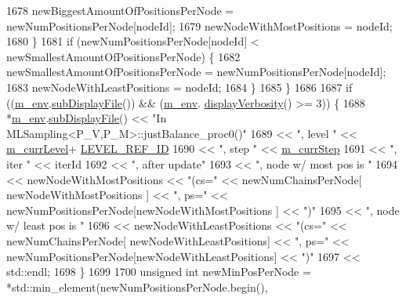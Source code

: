 \begin{DoxyCode}
1678         newBiggestAmountOfPositionsPerNode = newNumPositionsPerNode[nodeId];
1679         newNodeWithMostPositions = nodeId;
1680       \}
1681       \textcolor{keywordflow}{if} (newNumPositionsPerNode[nodeId] < newSmallestAmountOfPositionsPerNode) \{
1682         newSmallestAmountOfPositionsPerNode = newNumPositionsPerNode[nodeId];
1683         newNodeWithLeastPositions = nodeId;
1684       \}
1685     \}
1686 
1687     \textcolor{keywordflow}{if} ((\hyperlink{class_q_u_e_s_o_1_1_m_l_sampling_a13f1ca4fe9f94822fe572a743eaced1d}{m\_env}.\hyperlink{class_q_u_e_s_o_1_1_base_environment_a8a0064746ae8dddfece4229b9ad374d6}{subDisplayFile}()) && (\hyperlink{class_q_u_e_s_o_1_1_m_l_sampling_a13f1ca4fe9f94822fe572a743eaced1d}{m\_env}.
      \hyperlink{class_q_u_e_s_o_1_1_base_environment_a1fe5f244fc0316a0ab3e37463f108b96}{displayVerbosity}() >= 3)) \{
1688       *\hyperlink{class_q_u_e_s_o_1_1_m_l_sampling_a13f1ca4fe9f94822fe572a743eaced1d}{m\_env}.\hyperlink{class_q_u_e_s_o_1_1_base_environment_a8a0064746ae8dddfece4229b9ad374d6}{subDisplayFile}() << \textcolor{stringliteral}{"In MLSampling<P\_V,P\_M>::justBalance\_proc0()"}
1689                               << \textcolor{stringliteral}{", level "} << \hyperlink{class_q_u_e_s_o_1_1_m_l_sampling_af9416874c856e50f3b35270e801f17e4}{m\_currLevel}+
      \hyperlink{_m_l_sampling_level_options_8h_a68d15eaf394d210effcf584b938206d3}{LEVEL\_REF\_ID}
1690                               << \textcolor{stringliteral}{", step "}  << \hyperlink{class_q_u_e_s_o_1_1_m_l_sampling_a1b1f8ccb4823bdfa26ec652f0807c63e}{m\_currStep}
1691                               << \textcolor{stringliteral}{", iter "}  << iterId
1692                               << \textcolor{stringliteral}{", after update"}
1693                               << \textcolor{stringliteral}{", node w/ most pos is "}
1694                               << newNodeWithMostPositions  << \textcolor{stringliteral}{"(cs="} << newNumChainsPerNode[
      newNodeWithMostPositions ] << \textcolor{stringliteral}{", ps="} << newNumPositionsPerNode[newNodeWithMostPositions ] << \textcolor{stringliteral}{")"}
1695                               << \textcolor{stringliteral}{", node w/ least pos is "}
1696                               << newNodeWithLeastPositions << \textcolor{stringliteral}{"(cs="} << newNumChainsPerNode[
      newNodeWithLeastPositions] << \textcolor{stringliteral}{", ps="} << newNumPositionsPerNode[newNodeWithLeastPositions] << \textcolor{stringliteral}{")"}
1697                               << std::endl;
1698     \}
1699 
1700     \textcolor{keywordtype}{unsigned} \textcolor{keywordtype}{int} newMinPosPerNode = *std::min\_element(newNumPositionsPerNode.begin(), 

\end{DoxyCode}
